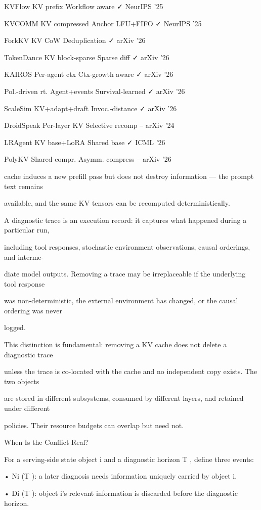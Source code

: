 \begin{flushleft}
\noindent  KVFlow KV prefix Workflow aware ✓ NeurIPS ’25\par
\noindent  KVCOMM KV compressed Anchor LFU+FIFO ✓ NeurIPS ’25\par
\noindent  ForkKV KV CoW Deduplication ✓ arXiv ’26\par
\noindent  TokenDance KV block-sparse Sparse diff ✓ arXiv ’26\par
\noindent  KAIROS Per-agent ctx Ctx-growth aware ✓ arXiv ’26\par
\noindent  Pol.-driven rt. Agent+events Survival-learned ✓ arXiv ’26\par
\noindent  ScaleSim KV+adapt+draft Invoc.-distance ✓ arXiv ’26\par
\noindent  DroidSpeak Per-layer KV Selective recomp – arXiv ’24\par
\noindent  LRAgent KV base+LoRA Shared base ✓ ICML ’26\par
\noindent  PolyKV Shared compr. Asymm. compress – arXiv ’26\par
\par\smallskip
\par\smallskip
\noindent cache induces a new prefill pass but does not destroy information — the prompt text remains\par
\noindent available, and the same KV tensors can be recomputed deterministically.\par
\noindent  A diagnostic trace is an execution record: it captures what happened during a particular run,\par
\noindent including tool responses, stochastic environment observations, causal orderings, and interme-\par
\noindent diate model outputs. Removing a trace may be irreplaceable if the underlying tool response\par
\noindent was non-deterministic, the external environment has changed, or the causal ordering was never\par
\noindent logged.\par
\noindent  This distinction is fundamental: removing a KV cache does not delete a diagnostic trace\par
\noindent unless the trace is co-located with the cache and no independent copy exists. The two objects\par
\noindent are stored in different subsystems, consumed by different layers, and retained under different\par
\noindent policies. Their resource budgets can overlap but need not.\par
\par\smallskip
{} When Is the Conflict Real?\par
\noindent For a serving-side state object i and a diagnostic horizon T , define three events:\par
\noindent  • Ni (T ): a later diagnosis needs information uniquely carried by object i.\par
\noindent  • Di (T ): object i’s relevant information is discarded before the diagnostic horizon.\par
\end{flushleft}
